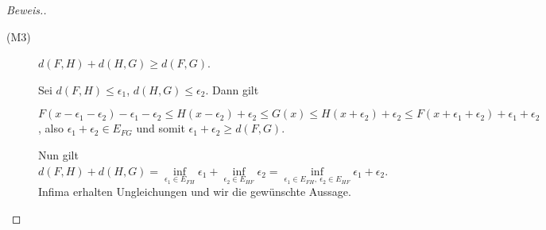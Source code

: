 \begin{proof}[Beweis.]
\begin{description}
    \item[(M3)] $d(F,H) + d(H,G) \geq d(F,G)$.

    Sei $d(F,H) \leq \epsilon_1$, $d(H,G) \leq \epsilon_2$. Dann gilt 

    $F(x - \epsilon_1 - \epsilon_2) - \epsilon_1 - \epsilon_2 \leq H(x - \epsilon_2) + \epsilon_2 \leq G(x) \leq H(x + \epsilon_2) +\epsilon_2 \leq F(x + \epsilon_1 + \epsilon_2) + \epsilon_1 + \epsilon_2$, also $\epsilon_1+\epsilon_2 \in E_{FG}$ und somit $\epsilon_1 +\epsilon_2 \geq d(F,G)$.

    Nun gilt $d(F,H) + d(H,G) = \inf\limits_{\epsilon_1 \in E_{FH}} \epsilon_1 + \inf\limits_{\epsilon_2 \in E_{HF}} \epsilon_2 = \inf\limits_{\epsilon_1 \in E_{FH},~\epsilon_2 \in E_{HF}} \epsilon_1 + \epsilon_2$. Infima erhalten Ungleichungen und wir die gewünschte Aussage.
    \end{description}
\end{proof}

